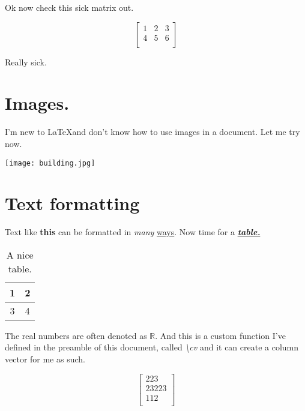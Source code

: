 \documentclass{article}
\newcommand{\cv}[3]{\begin{bmatrix}
#1\\
#2\\
#3\\
\end{bmatrix}}
\begin{document}
Ok now check this sick matrix out.

$$\begin{bmatrix}
1 & 2 & 3\\
4 & 5 & 6\\
\end{bmatrix}
$$

Really sick.

\section{Images.}

I'm new to \LaTeX and don't know how to use images in a document. Let me try now.

\smallskip
\begin{center}
\texttt{[image: building.jpg]}
\end{center}

\section{Text formatting}

Text like \textbf{this} can be formatted in \textit{many} \underline{ways}. Now time for a \textbf{\textit{\underline{table.}}}

\newpage

\begin{table}[]
\caption{A nice table.}
\begin{center}
    \begin{tabular}{|c|c|}
    \hline1 & 2 \\
    \hline3 & 4 \\
    \hline
    \end{tabular}
\end{center}
\end{table}

\newpage

The real numbers are often denoted as $\mathbb{R}$. And this is a custom function I've defined in the preamble of this document, called \textit{\textbackslash cv} and it can create a column vector for me as such.

$$\cv{223}{23223}{112}$$
\end{document}
